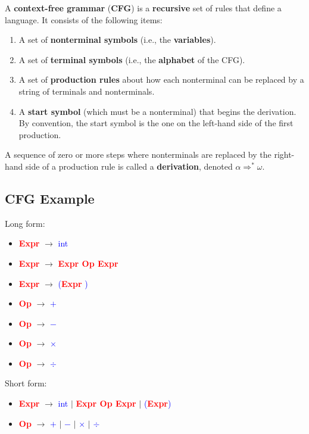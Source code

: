 \documentclass[12pt, letterpaper, oneside]{book}
\begin{document}
A \textbf{context-free grammar} (\textbf{CFG}) is a \textbf{recursive} set of rules that define a language. It consists
of the following items:
\begin{enumerate}
  \item A set of \textbf{nonterminal symbols} (i.e., the \textbf{variables}).
  \item A set of \textbf{terminal symbols} (i.e., the \textbf{alphabet} of the CFG).
  \item A set of \textbf{production rules} about how each nonterminal can be replaced by a string of terminals and
        nonterminals.
  \item A \textbf{start symbol} (which must be a nonterminal) that begins the derivation. By convention, the start
        symbol is the one on the left-hand side of the first production.
\end{enumerate}

A sequence of zero or more steps where nonterminals are replaced by the right-hand side of a production rule is called
a \textbf{derivation}, denoted $\alpha \Rightarrow^* \omega$.

\subsection{CFG Example}

Long form:

\begin{itemize}
  \item \textcolor{red}{\textbf{Expr}} $\rightarrow$ \textcolor{blue}{int}
  \item \textcolor{red}{\textbf{Expr}} $\rightarrow$ \textcolor{red}{\textbf{Expr Op Expr}}
  \item \textcolor{red}{\textbf{Expr}} $\rightarrow$ \textcolor{blue}{(}\textcolor{red}{\textbf{Expr}}
        \textcolor{blue}{)}
  \item \textcolor{red}{\textbf{Op}} $\rightarrow$ \textcolor{blue}{$+$}
  \item \textcolor{red}{\textbf{Op}} $\rightarrow$ \textcolor{blue}{$-$}
  \item \textcolor{red}{\textbf{Op}} $\rightarrow$ \textcolor{blue}{$\times$}
  \item \textcolor{red}{\textbf{Op}} $\rightarrow$ \textcolor{blue}{$\div$}
\end{itemize}

Short form:

\begin{itemize}
  \item \textcolor{red}{\textbf{Expr}} $\rightarrow$ \textcolor{blue}{int} $|$ \textcolor{red}{\textbf{Expr Op Expr}}
        $|$ \textcolor{blue}{(}\textcolor{red}{\textbf{Expr}}\textcolor{blue}{)}
  \item \textcolor{red}{\textbf{Op}} $\rightarrow$ \textcolor{blue}{$+$} $|$ \textcolor{blue}{$-$} $|$
        \textcolor{blue}{$\times$} $|$ \textcolor{blue}{$\div$}
\end{itemize}
\end{document}
